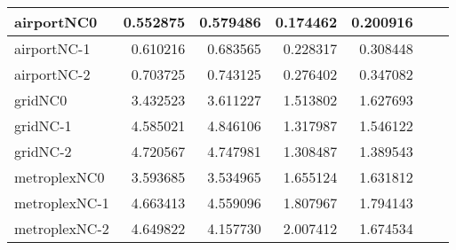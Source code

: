 \begin{longtable}{|l|r|r|r|r|r|r|}
airportNC0 & 0.552875 & 0.579486 & 0.174462 & 0.200916 \\ \hline
airportNC-1 & 0.610216 & 0.683565 & 0.228317 & 0.308448 \\ \hline
airportNC-2 & 0.703725 & 0.743125 & 0.276402 & 0.347082 \\ \hline
gridNC0 & 3.432523 & 3.611227 & 1.513802 & 1.627693 \\ \hline
gridNC-1 & 4.585021 & 4.846106 & 1.317987 & 1.546122 \\ \hline
gridNC-2 & 4.720567 & 4.747981 & 1.308487 & 1.389543 \\ \hline
metroplexNC0 & 3.593685 & 3.534965 & 1.655124 & 1.631812 \\ \hline
metroplexNC-1 & 4.663413 & 4.559096 & 1.807967 & 1.794143 \\ \hline
metroplexNC-2 & 4.649822 & 4.157730 & 2.007412 & 1.674534 \\ \hline
\end{longtable}
